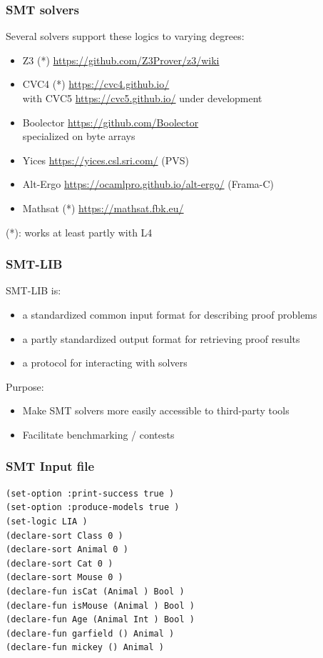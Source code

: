 \documentclass{beamer}
\begin{document}
\begin{frame}[fragile]\frametitle{SMT solvers}

  Several solvers support these logics to varying degrees:

  \begin{itemize}
  \item Z3 (*) \url{https://github.com/Z3Prover/z3/wiki}
  \item CVC4 (*) \url{https://cvc4.github.io/}\\
    with CVC5 \url{https://cvc5.github.io/} under development
  \item Boolector \url{https://github.com/Boolector}\\
    specialized on byte arrays
  \item Yices \url{https://yices.csl.sri.com/} (PVS)
  \item Alt-Ergo \url{https://ocamlpro.github.io/alt-ergo/} (Frama-C)
  \item Mathsat (*) \url{https://mathsat.fbk.eu/}
  \end{itemize}

(*): works at least partly with L4
\end{frame}


\begin{frame}[fragile]\frametitle{SMT-LIB}

  SMT-LIB is:
  \begin{itemize}
  \item a standardized common input format for describing proof problems
  \item a partly standardized output format for retrieving proof results
  \item a protocol for interacting with solvers
  \end{itemize}

  Purpose: 
  \begin{itemize}
  \item Make SMT solvers more easily accessible to third-party tools
  \item Facilitate benchmarking / contests
  \end{itemize}
\end{frame}


\begin{frame}[fragile]\frametitle{SMT Input file}

\begin{verbatim}
(set-option :print-success true )
(set-option :produce-models true )
(set-logic LIA )
(declare-sort Class 0 )
(declare-sort Animal 0 )
(declare-sort Cat 0 )
(declare-sort Mouse 0 )
(declare-fun isCat (Animal ) Bool )
(declare-fun isMouse (Animal ) Bool )
(declare-fun Age (Animal Int ) Bool )
(declare-fun garfield () Animal )
(declare-fun mickey () Animal )
\end{verbatim}
\end{frame}
\end{document}
